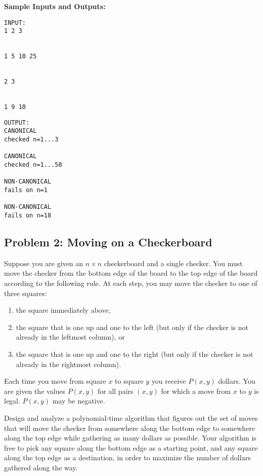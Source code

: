 \documentclass[11pt]{article}
\begin{document}
\begin{enumerate}[(a)]
\vspace{\baselineskip}

\textbf{Sample Inputs and Outputs:}

\begin{multicols}{3}
\begin{verbatim}
INPUT:
1 2 3


1 5 10 25


2 3


1 9 10

\end{verbatim}
\columnbreak
\begin{verbatim}
OUTPUT:
CANONICAL
checked n=1...3

CANONICAL
checked n=1...50

NON-CANONICAL
fails on n=1

NON-CANONICAL
fails on n=18
\end{verbatim}
\end{multicols}


\end{enumerate}





\subsection*{Problem 2: Moving on a Checkerboard}

Suppose you are given an $n \times n$ checkerboard and a single checker.
You must move the checker from the bottom edge of the board to the top edge of the board according to the following rule.
At each step, you may move the checker to one of three squares:

\begin{enumerate}
    \item the square immediately above, 
    \item the square that is one up and one to the left (but only if the checker is not already in the leftmost column), or
    \item the square that is one up and one to the right (but only if the checker is not already in the rightmost column).
\end{enumerate}

Each time you move from square $x$ to square $y$ you receive $P(x,y)$ dollars.
You are given the values $P(x,y)$ for all pairs $(x,y)$ for which a move from $x$ to $y$ is legal. $P(x,y)$ may be negative.

Design and analyze a polynomial-time algorithm that figures out the set of moves that will move the checker from somewhere along the bottom edge to somewhere along the top edge while gathering as many dollars as possible.
Your algorithm is free to pick any square along the bottom edge as a starting point, and any square along the top edge as a destination, in order to maximize the number of dollars gathered along the way.
\end{document}
